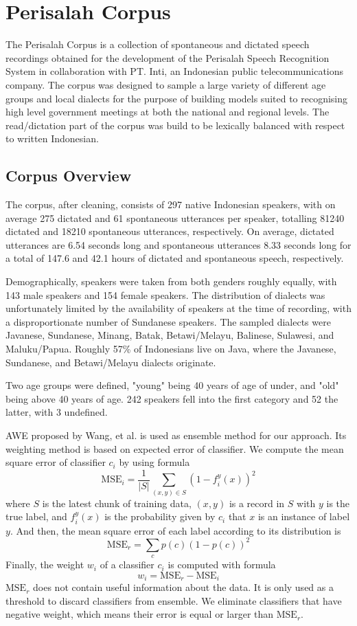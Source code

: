 \documentclass[conference]{IEEEtran}
\begin{document}
\section{Perisalah Corpus}

The Perisalah Corpus is a collection of spontaneous and dictated speech recordings obtained for the development of the Perisalah Speech Recognition System \cite{} in collaboration with PT. Inti, an Indonesian public telecommunications company.
The corpus was designed to sample a large variety of different age groups and local dialects for the purpose of building models suited to recognising high level government meetings at both the national and regional levels.
The read/dictation part of the corpus was build to be lexically balanced with respect to written Indonesian.

\subsection{Corpus Overview}

The corpus, after cleaning, consists of 297 native Indonesian speakers, with on average 275 dictated and 61 spontaneous utterances per speaker, totalling 81240 dictated and 18210 spontaneous utterances, respectively.
On average, dictated utterances are 6.54 seconds long and spontaneous utterances 8.33 seconds long for a total of 147.6 and 42.1 hours of dictated and spontaneous speech, respectively.

Demographically, speakers were taken from both genders roughly equally, with 143 male speakers and 154 female speakers.
The distribution of dialects was unfortunately limited by the availability of speakers at the time of recording, with a disproportionate number of Sundanese speakers.
The sampled dialects were Javanese, Sundanese, Minang, Batak, Betawi/Melayu, Balinese, Sulawesi, and Maluku/Papua.
Roughly 57\% of Indonesians live on Java, where the Javanese, Sundanese, and Betawi/Melayu dialects originate.

Two age groups were defined, "young" being 40 years of age of under, and "old" being above 40 years of age.
242 speakers fell into the first category and 52 the latter, with 3 undefined.

AWE proposed by Wang, et al. \cite{wang} is used as ensemble method for our approach.
Its weighting method is based on expected error of classifier.
We compute the mean square error of classifier $c_i$ by using formula
\[\text{MSE}_i = \frac{1}{|S|} \sum_{(x,y) \in S} (1 - f_i^y(x))^2\]
where $S$ is the latest chunk of training data, $(x,y)$ is a record in $S$ with $y$ is the true label, and $f_i^y(x)$ is the probability given by $c_i$ that $x$ is an instance of label $y$.
And then, the mean square error of each label according to its distribution is
\[\text{MSE}_r = \sum_{c} p(c)(1-p(c))^2\]
Finally, the weight $w_i$ of a classifier $c_i$ is computed with formula
\[w_i = \text{MSE}_r - \text{MSE}_i\]
$\text{MSE}_r$ does not contain useful information about the data.
It is only used as a threshold to discard classifiers from ensemble.
We eliminate classifiers that have negative weight, which means their error is equal or larger than $\text{MSE}_r$.
\end{document}
